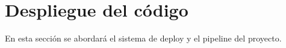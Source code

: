 
\section{Despliegue del código}\label{sec:despliegue-del-codigo}
En esta sección se abordará el sistema de deploy y el pipeline del proyecto.
